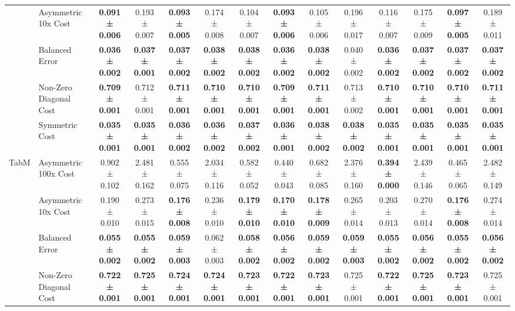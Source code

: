 \begin{table}[H]
{\begin{tabular}{llcccccccccccc}
 & Asymmetric 10x Cost & \textbf{0.091 ± 0.006} & 0.193 ± 0.007 & \textbf{0.093 ± 0.005} & 0.174 ± 0.008 & 0.104 ± 0.007 & \textbf{0.093 ± 0.006} & 0.105 ± 0.006 & 0.196 ± 0.017 & 0.116 ± 0.007 & 0.175 ± 0.009 & \textbf{0.097 ± 0.005} & 0.189 ± 0.011 \\
 & Balanced Error & \textbf{0.036 ± 0.002} & \textbf{0.037 ± 0.001} & \textbf{0.037 ± 0.002} & \textbf{0.038 ± 0.002} & \textbf{0.038 ± 0.002} & \textbf{0.036 ± 0.002} & \textbf{0.038 ± 0.002} & 0.040 ± 0.002 & \textbf{0.036 ± 0.002} & \textbf{0.037 ± 0.002} & \textbf{0.037 ± 0.002} & \textbf{0.037 ± 0.002} \\
 & Non-Zero Diagonal Cost & \textbf{0.709 ± 0.001} & 0.712 ± 0.001 & \textbf{0.711 ± 0.001} & \textbf{0.710 ± 0.001} & \textbf{0.710 ± 0.001} & \textbf{0.709 ± 0.001} & \textbf{0.711 ± 0.001} & 0.713 ± 0.002 & \textbf{0.710 ± 0.001} & \textbf{0.710 ± 0.001} & \textbf{0.710 ± 0.001} & \textbf{0.711 ± 0.001} \\
 & Symmetric Cost & \textbf{0.035 ± 0.001} & \textbf{0.035 ± 0.001} & \textbf{0.036 ± 0.002} & \textbf{0.036 ± 0.002} & \textbf{0.037 ± 0.002} & \textbf{0.036 ± 0.001} & \textbf{0.038 ± 0.002} & \textbf{0.038 ± 0.002} & \textbf{0.035 ± 0.001} & \textbf{0.035 ± 0.001} & \textbf{0.035 ± 0.001} & \textbf{0.035 ± 0.001} \\
\cline{1-14}
\multirow[t]{5}{*}{TabM} & Asymmetric 100x Cost & 0.902 ± 0.102 & 2.481 ± 0.162 & 0.555 ± 0.075 & 2.034 ± 0.116 & 0.582 ± 0.052 & 0.440 ± 0.043 & 0.682 ± 0.085 & 2.376 ± 0.160 & \textbf{0.394 ± 0.000} & 2.439 ± 0.146 & 0.465 ± 0.065 & 2.482 ± 0.149 \\
 & Asymmetric 10x Cost & 0.190 ± 0.010 & 0.273 ± 0.015 & \textbf{0.176 ± 0.008} & 0.236 ± 0.010 & \textbf{0.179 ± 0.010} & \textbf{0.170 ± 0.010} & \textbf{0.178 ± 0.009} & 0.265 ± 0.014 & 0.203 ± 0.013 & 0.270 ± 0.014 & \textbf{0.176 ± 0.008} & 0.274 ± 0.014 \\
 & Balanced Error & \textbf{0.055 ± 0.002} & \textbf{0.055 ± 0.002} & \textbf{0.059 ± 0.003} & 0.062 ± 0.003 & \textbf{0.058 ± 0.002} & \textbf{0.056 ± 0.002} & \textbf{0.059 ± 0.002} & \textbf{0.059 ± 0.003} & \textbf{0.055 ± 0.002} & \textbf{0.056 ± 0.002} & \textbf{0.055 ± 0.002} & \textbf{0.056 ± 0.002} \\
 & Non-Zero Diagonal Cost & \textbf{0.722 ± 0.001} & \textbf{0.725 ± 0.001} & \textbf{0.724 ± 0.001} & \textbf{0.724 ± 0.001} & \textbf{0.723 ± 0.001} & \textbf{0.722 ± 0.001} & \textbf{0.723 ± 0.001} & 0.725 ± 0.001 & \textbf{0.722 ± 0.001} & \textbf{0.725 ± 0.001} & \textbf{0.723 ± 0.001} & 0.725 ± 0.001 \\

\end{tabular}}
\end{table}
